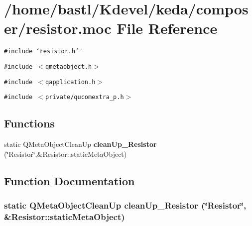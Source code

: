 \section{/home/bastl/Kdevel/keda/composer/resistor.moc File Reference}
\label{resistor_8moc}
{\tt \#include \char`\"{}resistor.h\char`\"{}}\par
{\tt \#include $<$qmetaobject.h$>$}\par
{\tt \#include $<$qapplication.h$>$}\par
{\tt \#include $<$private/qucomextra\_\-p.h$>$}\par
\subsection*{Functions}
\begin{CompactItemize}
\item 
static QMeta\-Object\-Clean\-Up {\bf clean\-Up\_\-Resistor} (\char`\"{}Resistor\char`\"{},\&Resistor::static\-Meta\-Object)
\end{CompactItemize}


\subsection{Function Documentation}
\subsubsection{\setlength{\rightskip}{0pt plus 5cm}static QMeta\-Object\-Clean\-Up clean\-Up\_\-Resistor (\char`\"{}Resistor\char`\"{}, \&Resistor::static\-Meta\-Object)\hspace{0.3cm}{\tt  [static]}}\label{resistor_8moc_8124f48174b6b09a7e734bab2d9d99e0}


